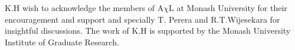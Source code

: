 K.H wish to acknowledge the members of A$\chi$L at Monash University for their encouragement and support and specially T. Perera and R.T.Wijesekara for insightful discussions. The work of K.H is supported by the Monash University Institute of Graduate Research.
